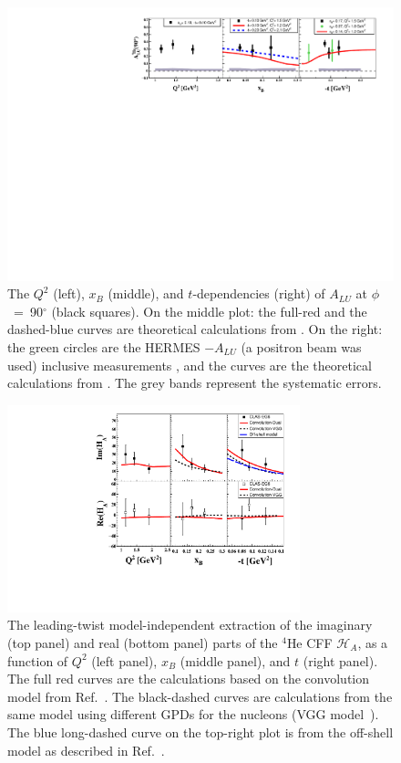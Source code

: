 \documentclass[twocolumn,nofootinbib,showpacs,prl,superscriptaddress,secnumarabic,amssymb,nobibnotes,aps,floatfix]{revtex4}
\begin{document}
\begin{figure}[tb]
\includegraphics[width=16cm]{figs/F_Coherent_ALU_phi_90.pdf}
\caption{The $Q^{2}$ (left), $x_{B}$ (middle), and $t$-dependencies (right) of
   $A_{LU}$ at $\phi$~=~90$^{\circ}$ (black squares). On the 
   middle plot: the full-red and the dashed-blue curves are theoretical 
   calculations from \cite{simonetta_2}. On the right: the green circles are 
   the HERMES $-A_{LU}$ (a positron beam was used) inclusive measurements 
   \cite{Airapetian}, and the curves are the theoretical calculations 
   from \cite{simonetta_2}. The grey bands represent the systematic errors.}
\label{fig:alu90}
\end{figure}


\begin{figure}[tb]
\includegraphics[width=8.5cm]{figs/F_Coherent_CFF.pdf}
\caption{The leading-twist model-independent extraction of the imaginary (top panel) and
real (bottom panel) parts of the $^4$He CFF $\mathcal{H}_A$, as a function of
$Q^{2}$ (left panel), $x_B$ (middle panel), and $t$ (right panel). The full red 
curves are the calculations based on the convolution model from Ref.~\cite{Vadim_priv}.
The black-dashed curves are calculations from the same 
model using different GPDs for the nucleons (VGG model~\cite{Guidal_priv}). The 
blue long-dashed curve on the top-right plot is from
the off-shell model as described in Ref.~\cite{GonzalezHernandez:2012jv}.}
\label{fig:CFF_HA}
\end{figure}
\end{document}

